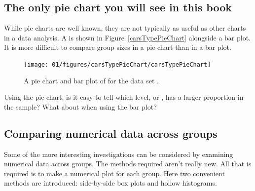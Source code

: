 \subsection{The only pie chart you will see in this book}

While pie charts are well known, they are not typically as useful as other charts in a data analysis. A  is shown in Figure~\vref{carsTypePieChart} alongside a bar plot. It is more difficult to compare group sizes in a pie chart than in a bar plot. %
\begin{figure}%
   \centering
   \texttt{[image: 01/figures/carsTypePieChart/carsTypePieChart]}
   \caption{A pie chart and bar plot of  for the data set .}
   \label{carsTypePieChart}
\end{figure}

\begin{exercise}
Using the pie chart, is it easy to tell which level,  or , has a larger proportion in the sample? What about when using the bar plot?
\end{exercise}

\subsection{Comparing numerical data across groups}
\label{comparingAcrossGroups}

Some of the more interesting investigations can be considered by examining numerical data across groups. The methods required aren't really new. All that is required is to make a numerical plot for each group. Here two convenient methods are introduced: side-by-side box plots and hollow histograms.


